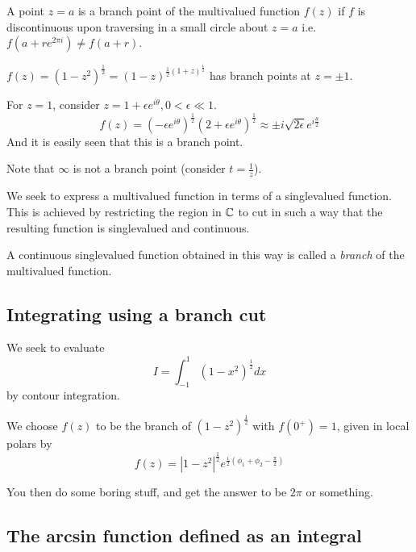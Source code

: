 \documentclass[a4paper]{article}
\begin{document}
\begin{defn}
	A point $z=a$ is a branch point of the multivalued function $f(z)$ if $f$ is discontinuous upon traversing in a small circle about $z=a$ i.e.  $f(a+re^{2\pi i}) \neq f(a+r)$.
\end{defn}

\begin{eg}
	$f(z) = (1-z^2)^{\frac{1}{2}} = (1-z)^{\frac{1}{2}(1+z)^{\frac{1}{2}}}$ has branch points at $z=\pm 1$.

	For $z=1$, consider $z=1 + \epsilon e^{i\theta}, 0<\epsilon \ll 1$.
	\[
		f(z) = (-\epsilon e^{i\theta})^{\frac{1}{2}}(2+\epsilon e^{i\theta})^{\frac{1}{2}} \approx \pm i \sqrt{2\epsilon} e^{i\frac{\theta}{2}}
	\]
	And it is easily seen that this is a branch point.

	Note that $\infty$ is not a branch point (consider $t = \frac{1}{z}$).

\end{eg}

\vspace{1em}

We seek to express a multivalued function in terms of a singlevalued function. This is achieved by restricting the region in $\mathbb{C}$ to cut in such a way that the resulting function is singlevalued and continuous.

\begin{defn}
	A continuous singlevalued function obtained in this way is called a \textit{branch} of the multivalued function.
\end{defn}

\subsection*{Integrating using a branch cut}

We seek to evaluate \[
	I = \int_{-1}^{1} (1-x^2)^{\frac{1}{2}} dx
\] by contour integration.

We choose $f(z)$ to be the branch of $(1-z^2)^{\frac{1}{2}}$ with $f(0^{+}) = 1$, given in local polars by \[
	f(z) = |1-z^2|^{\frac{1}{2}} e^{\frac{i}{2}\left(\phi_1 + \phi_2 - \frac{\pi}{2}  \right) }
\]

You then do some boring stuff, and get the answer to be  $2\pi$ or something.

\subsection*{The arcsin function defined as an integral}
\end{document}
